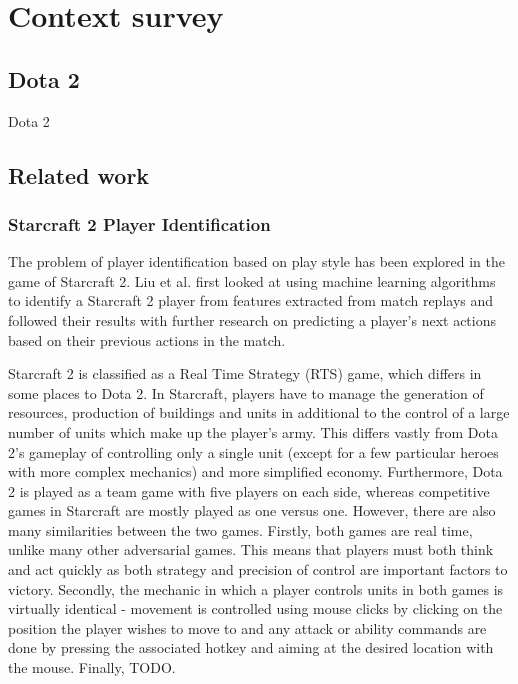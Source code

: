 \documentclass[Report.tex]{subfiles}
\begin{document}
\section{Context survey}


\subsection{Dota 2}



Dota 2

\subsection{Related work}

\subsubsection{Starcraft 2 Player Identification}
The problem of player identification based on play style has been explored in the game of Starcraft 2. Liu et al. \cite{starcraft-identification} first looked at using machine learning algorithms to identify a Starcraft 2 player from features extracted from match replays and followed their results with further research \cite{starcraft-actions} on predicting a player's next actions based on their previous actions in the match. 

Starcraft 2 is classified as a Real Time Strategy (RTS) game, which differs in some places to Dota 2. In Starcraft, players have to manage the generation of resources, production of buildings and units in additional to the control of a large number of units which make up the player's army. This differs vastly from Dota 2's gameplay of controlling only a single unit (except for a few particular heroes with more complex mechanics) and more simplified economy. Furthermore, Dota 2 is played as a team game with five players on each side, whereas competitive games in Starcraft are mostly played as one versus one. However, there are also many similarities between the two games. Firstly, both games are real time, unlike many other adversarial games. This means that players must both think and act quickly as both strategy and precision of control are important factors to victory. Secondly, the mechanic in which a player controls units in both games is virtually identical - movement is controlled using mouse clicks by clicking on the position the player wishes to move to and any attack or ability commands are done by pressing the associated hotkey and aiming at the desired location with the mouse. Finally, TODO.
\end{document}
